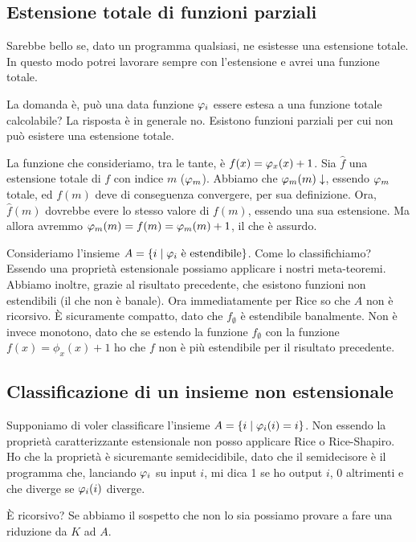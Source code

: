 \subsection{Estensione totale di funzioni parziali}

Sarebbe bello se, dato un programma qualsiasi, ne esistesse una estensione totale. In questo modo
potrei lavorare sempre con l'estensione e avrei una funzione totale.

La domanda è, può una data funzione $\varphi_{i}$ essere estesa a una funzione totale calcolabile? La
risposta è in generale no. Esistono funzioni parziali per cui non può esistere una estensione
totale.

La funzione che consideriamo, tra le tante, è $f(x) = \varphi_{x}(x) + 1$. Sia $\hat{f}$ una estensione
totale di $f$ con indice $m$ ($\varphi_{m}$). Abbiamo che $\varphi_{m}(m) \downarrow$, essendo $\varphi_{m}$ totale,
ed $f(m)$ deve di conseguenza convergere, per sua definizione. Ora, $\hat{f}(m)$ dovrebbe evere lo
stesso valore di $f(m)$, essendo una sua estensione. Ma allora avremmo $\varphi_{m}(m) = f(m) = \varphi_{m}(m) +
1$, il che è assurdo.

Consideriamo l'insieme $A = \{i \mid \varphi_{i} \text{ è estendibile}\}$. Come lo classifichiamo? Essendo una
proprietà estensionale possiamo applicare i nostri meta-teoremi. Abbiamo inoltre, grazie al
risultato precedente, che esistono funzioni non estendibili (il che non è banale). Ora
immediatamente per Rice so che $A$ non è ricorsivo. È sicuramente compatto, dato
che $f_{\emptyset}$ è estendibile banalmente. Non è invece monotono, dato che se estendo la funzione
$f_{\emptyset}$ con la funzione $f(x) = \phi_{x}(x) + 1$  ho che $f$ non è più estendibile per il
risultato precedente.

\subsection{Classificazione di un insieme non estensionale}

Supponiamo di voler classificare l'insieme $A = \{i \mid \varphi_{i}(i) = i\}$. Non essendo la proprietà
caratterizzante estensionale non posso applicare Rice o Rice-Shapiro. Ho che la proprietà è
sicuremante semidecidibile, dato che il semidecisore è il programma che, lanciando $\varphi_{i}$ su input
$i$, mi dica 1 se ho output $i$, 0 altrimenti e che diverge se $\varphi_{i}(i)$ diverge.

È ricorsivo? Se abbiamo il sospetto che non lo sia possiamo provare a fare una riduzione da $K$ ad
$A$.

